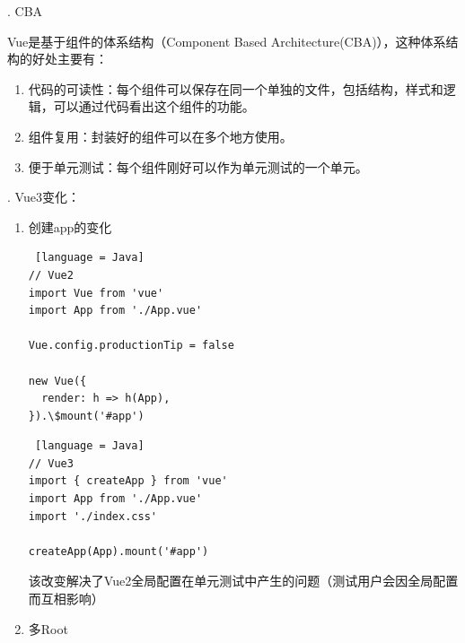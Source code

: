 . CBA

Vue是基于组件的体系结构（Component Based Architecture(CBA)），这种体系结构的好处主要有：
\begin{enumerate}
  \item 代码的可读性：每个组件可以保存在同一个单独的文件，包括结构，样式和逻辑，可以通过代码看出这个组件的功能。
  \item 组件复用：封装好的组件可以在多个地方使用。
  \item 便于单元测试：每个组件刚好可以作为单元测试的一个单元。
\end{enumerate}

. Vue3变化：
\begin{enumerate}
  \item 创建app的变化
        \begin{lstlisting} [language = Java]
// Vue2
import Vue from 'vue'
import App from './App.vue'

Vue.config.productionTip = false

new Vue({
  render: h => h(App),
}).\$mount('#app')
    \end{lstlisting}
        \begin{lstlisting} [language = Java]
// Vue3
import { createApp } from 'vue'
import App from './App.vue'
import './index.css'

createApp(App).mount('#app')
    \end{lstlisting}
        该改变解决了Vue2全局配置在单元测试中产生的问题（测试用户会因全局配置而互相影响）
  \item 多Root


\end{enumerate}
